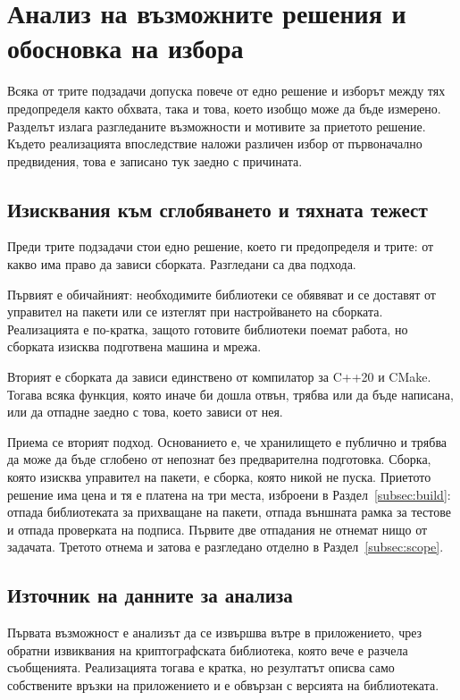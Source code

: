 \section{Анализ на възможните решения и обосновка на избора}
\label{sec:alternatives}

Всяка от трите подзадачи допуска повече от едно решение и изборът между тях предопределя
както обхвата, така и това, което изобщо може да бъде измерено. Разделът излага
разгледаните възможности и мотивите за приетото решение. Където реализацията впоследствие
наложи различен избор от първоначално предвидения, това е записано тук заедно с причината.

\subsection{Изисквания към сглобяването и тяхната тежест}
\label{subsec:dependencies}

Преди трите подзадачи стои едно решение, което ги предопределя и трите: от какво има право
да зависи сборката. Разгледани са два подхода.

Първият е обичайният: необходимите библиотеки се обявяват и се доставят от управител на
пакети или се изтеглят при настройването на сборката. Реализацията е по-кратка, защото
готовите библиотеки поемат работа, но сборката изисква подготвена машина и мрежа.

Вторият е сборката да зависи единствено от компилатор за C++20 и CMake. Тогава всяка
функция, която иначе би дошла отвън, трябва или да бъде написана, или да отпадне заедно с
това, което зависи от нея.

Приема се вторият подход. Основанието е, че хранилището е публично и трябва да може да
бъде сглобено от непознат без предварителна подготовка. Сборка, която изисква управител на
пакети, е сборка, която никой не пуска. Приетото решение има цена и тя е платена на три
места, изброени в Раздел~\ref{subsec:build}: отпада библиотеката за прихващане на пакети,
отпада външната рамка за тестове и отпада проверката на подписа. Първите две отпадания не
отнемат нищо от задачата. Третото отнема и затова е разгледано отделно в
Раздел~\ref{subsec:scope}.

\subsection{Източник на данните за анализа}
\label{subsec:source}

Първата възможност е анализът да се извършва вътре в приложението, чрез обратни извиквания
на криптографската библиотека, която вече е разчела съобщенията. Реализацията тогава е
кратка, но резултатът описва само собствените връзки на приложението и е обвързан с
версията на библиотеката.

